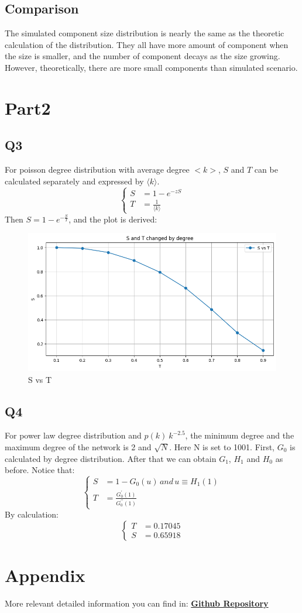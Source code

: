 \documentclass{article}
\begin{document}
	\subsection*{Comparison}
	The simulated component size distribution is nearly the same as the theoretic calculation of the distribution. They all have more amount of component when the size is smaller, and the number of component decays as the size growing. However, theoretically, there are more small components than simulated scenario. 
	
	\section*{Part2}
	\subsection*{Q3}
	For poisson degree distribution with average degree $<k>$, $S$ and $T$ can be calculated separately and expressed by $\langle k \rangle$.
	\[
	\left\{
	\begin{aligned}
		S &= 1 - e^{-zS} \\
		T &= \frac{1}{\langle k \rangle}
	\end{aligned}
	\right.
	\]
	Then $S = 1 - e^{-\frac{S}{T}}$, and the plot is derived:
	\begin{figure}[H]
		\centering
		\includegraphics[scale=0.5]{P2Q3.png}
		\caption{S vs T}
	\end{figure}
	
	\subsection*{Q4}
	For power law degree distribution and $p(k) ~ k^{-2.5}$, the minimum degree and the maximum degree of the network is 2 and $\sqrt{N}$. Here N is set to 1001. First, $G_0$ is calculated by degree distribution. After that we can obtain $G_1$, $H_1$ and $H_0$ as before. Notice that:
	\[
	\left\{
	\begin{aligned}
		S &= 1- G_0(u) \, and \, u \equiv H_1(1) \\
		T &= \frac{G^{\prime}_0(1)}{G^{\prime\prime}_0(1)}
	\end{aligned}
	\right.
	\]
	By calculation:
	\[
	\left\{
	\begin{aligned}
		T &= 0.17045 \\
		S &= 0.65918
	\end{aligned}
	\right.
	\]
	
	\section*{Appendix}
	More relevant detailed information you can find in: 
	\href{https://github.com/DingYX0731/Selected-Topics-in-Frontiers-of-Statistics}{\textbf{Github Repository}}
	
	
\end{document}

